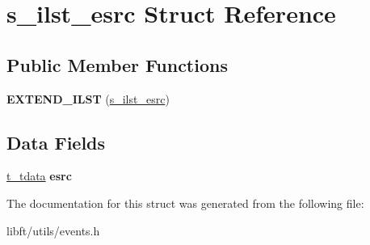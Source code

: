 \hypertarget{structs__ilst__esrc}{}\section{s\+\_\+ilst\+\_\+esrc Struct Reference}
\label{structs__ilst__esrc}
\subsection*{Public Member Functions}
\begin{DoxyCompactItemize}
\item 
\hypertarget{structs__ilst__esrc_a2d831c6c53164d07566caa5bad436c61}{}{\bfseries E\+X\+T\+E\+N\+D\+\_\+\+I\+L\+S\+T} (\hyperlink{structs__ilst__esrc}{s\+\_\+ilst\+\_\+esrc})\label{structs__ilst__esrc_a2d831c6c53164d07566caa5bad436c61}

\end{DoxyCompactItemize}
\subsection*{Data Fields}
\begin{DoxyCompactItemize}
\item 
\hypertarget{structs__ilst__esrc_a4e861bb11c3a6979e9b79fb14915a965}{}\hyperlink{structs__tdata}{t\+\_\+tdata} {\bfseries esrc}\label{structs__ilst__esrc_a4e861bb11c3a6979e9b79fb14915a965}

\end{DoxyCompactItemize}


The documentation for this struct was generated from the following file\+:\begin{DoxyCompactItemize}
\item 
libft/utils/events.\+h\end{DoxyCompactItemize}
